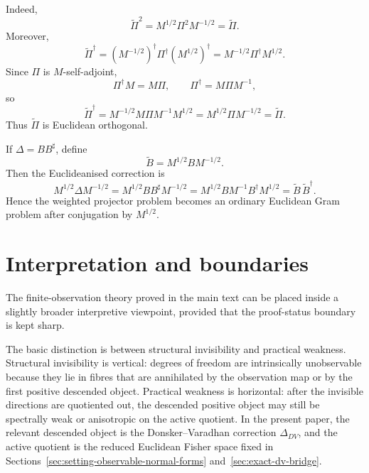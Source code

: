 \documentclass[11pt,a4paper]{article}
\numberwithin{equation}{section}
\theoremstyle{thmcompact}
\theoremstyle{remark}
\begin{document}
Indeed,
\begin{equation}
\widetilde\Pi^2
=
M^{1/2}\Pi^2 M^{-1/2}
=
\widetilde\Pi.
\end{equation}
Moreover,
\begin{equation}
\widetilde\Pi^\dagger
=
(M^{-1/2})^\dagger \Pi^\dagger (M^{1/2})^\dagger
=
M^{-1/2}\Pi^\dagger M^{1/2}.
\end{equation}
Since \(\Pi\) is \(M\)-self-adjoint,
\begin{equation}
\Pi^\dagger M=M\Pi,
\qquad
\Pi^\dagger=M\Pi M^{-1},
\end{equation}
so
\begin{equation}
\widetilde\Pi^\dagger
=
M^{-1/2}M\Pi M^{-1}M^{1/2}
=
M^{1/2}\Pi M^{-1/2}
=
\widetilde\Pi.
\end{equation}
Thus \(\widetilde\Pi\) is Euclidean orthogonal.

If \(\Delta=BB^\sharp\), define
\begin{equation}
\widetilde B=M^{1/2}BM^{-1/2}.
\end{equation}
Then the Euclideanised correction is
\begin{equation}
M^{1/2}\Delta M^{-1/2}
=
M^{1/2}BB^\sharp M^{-1/2}
=
M^{1/2}BM^{-1}B^\dagger M^{1/2}
=
\widetilde B\,\widetilde B^\dagger.
\end{equation}
Hence the weighted projector problem becomes an ordinary Euclidean Gram problem after conjugation by \(M^{1/2}\).

\section{Interpretation and boundaries}
\label{app:quotient_shadow_viewpoint}

The finite-observation theory proved in the main text can be placed inside a slightly broader interpretive viewpoint, provided that the proof-status boundary is kept sharp.

The basic distinction is between structural invisibility and practical weakness. Structural invisibility is vertical: degrees of freedom are intrinsically unobservable because they lie in fibres that are annihilated by the observation map or by the first positive descended object. Practical weakness is horizontal: after the invisible directions are quotiented out, the descended positive object may still be spectrally weak or anisotropic on the active quotient. In the present paper, the relevant descended object is the Donsker--Varadhan correction \(\Delta_{DV}\), and the active quotient is the reduced Euclidean Fisher space fixed in Sections~\ref{sec:setting-observable-normal-forms} and~\ref{sec:exact-dv-bridge}.
\end{document}
